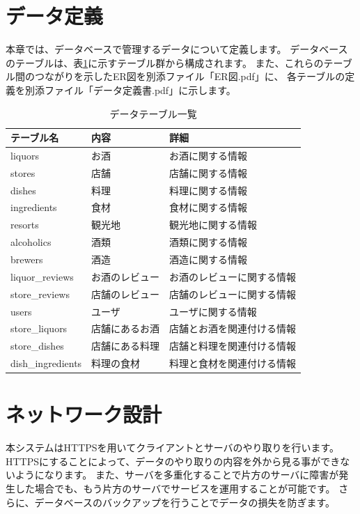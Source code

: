 \documentclass[a4j,titlepage]{jarticle}
\begin{document}
\section{データ定義}
本章では、データベースで管理するデータについて定義します。
データベースのテーブルは、表\ref{tables}に示すテーブル群から構成されます。
また、これらのテーブル間のつながりを示したER図を別添ファイル「ER図.pdf」に、
各テーブルの定義を別添ファイル「データ定義書.pdf」に示します。
​
\begin{table}[!htbp]
\caption{データテーブル一覧}
\label{tables}
\begin{center}
\begin{tabular}{|l|l|l|}\hline
テーブル名 & 内容 & 詳細\\\hline\hline
liquors & お酒 & お酒に関する情報\\\hline
stores & 店舗 & 店舗に関する情報\\\hline
dishes & 料理 & 料理に関する情報\\\hline
ingredients & 食材 & 食材に関する情報\\\hline
resorts & 観光地 & 観光地に関する情報\\\hline
alcoholics & 酒類 & 酒類に関する情報\\\hline
brewers & 酒造 & 酒造に関する情報\\\hline
liquor\_reviews & お酒のレビュー & お酒のレビューに関する情報\\\hline
store\_reviews & 店舗のレビュー & 店舗のレビューに関する情報\\\hline
users & ユーザ & ユーザに関する情報\\\hline
store\_liquors & 店舗にあるお酒 & 店舗とお酒を関連付ける情報\\\hline
store\_dishes & 店舗にある料理 & 店舗と料理を関連付ける情報\\\hline
dish\_ingredients & 料理の食材 & 料理と食材を関連付ける情報\\\hline
\end{tabular}
\end{center}
\end{table}

\section{ネットワーク設計}
本システムはHTTPSを用いてクライアントとサーバのやり取りを行います。
HTTPSにすることによって、データのやり取りの内容を外から見る事ができないようになります。
また、サーバを多重化することで片方のサーバに障害が発生した場合でも、もう片方のサーバでサービスを運用することが可能です。
さらに、データベースのバックアップを行うことでデータの損失を防ぎます。
\end{document}
